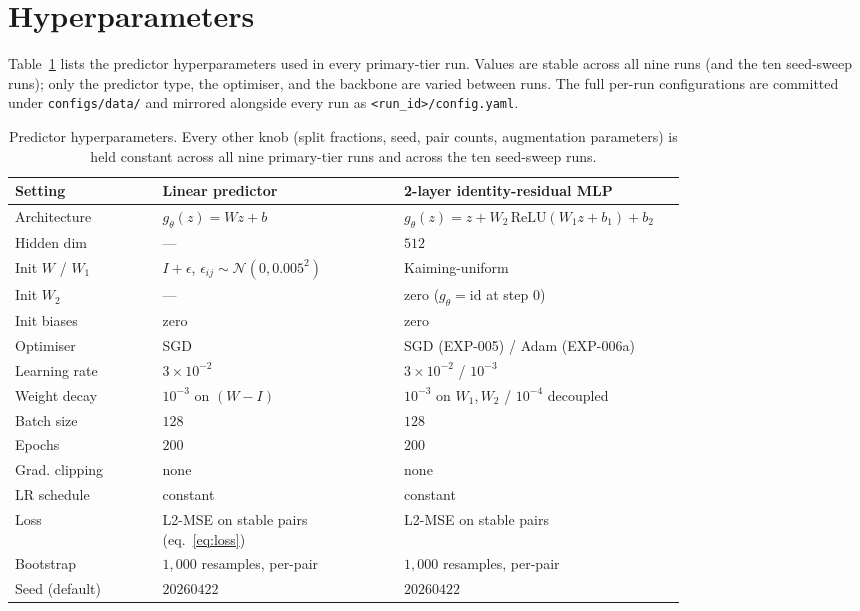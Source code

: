 \section{Hyperparameters}
\label{app:hyperparameters}

Table~\ref{tab:hyperparameters} lists the predictor hyperparameters used
in every primary-tier run. Values are stable across all nine runs (and
the ten seed-sweep runs); only the predictor type, the optimiser, and
the backbone are varied between runs. The full per-run configurations
are committed under \texttt{configs/data/} and mirrored alongside every
run as \texttt{<run\_id>/config.yaml}.

\begin{table}[h]
\centering
\small
\setlength{\tabcolsep}{4pt}
\begin{tabular}{@{}lp{0.36\linewidth}p{0.42\linewidth}@{}}
\toprule
Setting & Linear predictor & 2-layer identity-residual MLP \\
\midrule
Architecture        & $g_{\theta}(z) = Wz + b$ & $g_{\theta}(z) = z + W_{2}\,\mathrm{ReLU}(W_{1}z + b_{1}) + b_{2}$ \\
Hidden dim          & ---       & $512$ \\
Init $W$ / $W_{1}$  & $I + \epsilon$, $\epsilon_{ij} \sim \mathcal{N}(0, 0.005^{2})$ & Kaiming-uniform \\
Init $W_{2}$        & ---       & zero ($g_{\theta} = \mathrm{id}$ at step $0$) \\
Init biases         & zero      & zero \\
Optimiser           & SGD       & SGD (EXP-005) / Adam (EXP-006a) \\
Learning rate       & $3\!\times\!10^{-2}$ & $3\!\times\!10^{-2}$ / $10^{-3}$ \\
Weight decay        & $10^{-3}$ on $(W - I)$ & $10^{-3}$ on $W_{1}, W_{2}$ / $10^{-4}$ decoupled \\
Batch size          & $128$     & $128$ \\
Epochs              & $200$     & $200$ \\
Grad. clipping      & none      & none \\
LR schedule         & constant  & constant \\
Loss                & L2-MSE on stable pairs (eq.~\ref{eq:loss}) & L2-MSE on stable pairs \\
Bootstrap           & $1{,}000$ resamples, per-pair & $1{,}000$ resamples, per-pair \\
Seed (default)      & $20260422$ & $20260422$ \\
\bottomrule
\end{tabular}
\caption{Predictor hyperparameters. Every other knob (split fractions,
seed, pair counts, augmentation parameters) is held constant across all
nine primary-tier runs and across the ten seed-sweep runs.}
\label{tab:hyperparameters}
\end{table}

